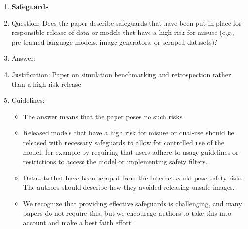 \documentclass{article}
\begin{document}
\begin{enumerate}
\item {\bf Safeguards}
    \item[] Question: Does the paper describe safeguards that have been put in place for responsible release of data or models that have a high risk for misuse (e.g., pre-trained language models, image generators, or scraped datasets)?
    \item[] Answer: \answerNA{} %
    \item[] Justification: Paper on simulation benchmarking and retrospection rather than a high-risk release
    \item[] Guidelines:
    \begin{itemize}
        \item The answer \answerNA{} means that the paper poses no such risks.
        \item Released models that have a high risk for misuse or dual-use should be released with necessary safeguards to allow for controlled use of the model, for example by requiring that users adhere to usage guidelines or restrictions to access the model or implementing safety filters.
        \item Datasets that have been scraped from the Internet could pose safety risks. The authors should describe how they avoided releasing unsafe images.
        \item We recognize that providing effective safeguards is challenging, and many papers do not require this, but we encourage authors to take this into account and make a best faith effort.
    \end{itemize}


\end{enumerate}
\end{document}
